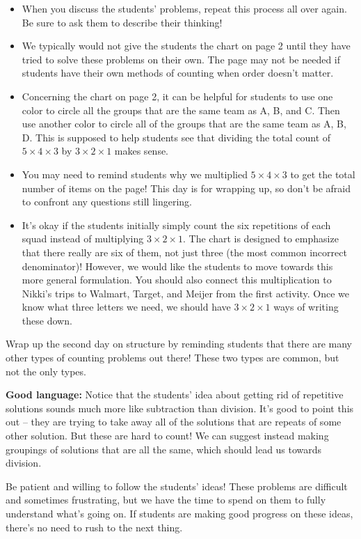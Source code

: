 \documentclass[nooutcomes, noauthor]{ximera}
\begin{document}
\begin{instructorNotes}
\begin{itemize}
	\item When you discuss the students' problems, repeat this process all over again. Be sure to ask them to describe their thinking!
	\item We typically would not give the students the chart on page 2 until they have tried to solve these problems on their own. The page may not be needed if students have their own methods of counting when order doesn't matter.
	\item Concerning the chart on page 2, it can be helpful for students to use one color to circle all the groups that are the same team as A, B, and C.  Then use another color to circle all of the groups that are the same team as A, B, D.  This is supposed to help students see that dividing the total count of $5 \times 4 \times 3$ by $3 \times 2 \times 1$ makes sense.
	\item You may need to remind students why we multiplied $5 \times 4 \times 3$ to get the total number of items on the page! This day is for wrapping up, so don't be afraid to confront any questions still lingering.
	\item It's okay if the students initially simply count the six repetitions of each squad instead of multiplying $3 \times 2 \times 1$. The chart is designed to emphasize that there really are six of them, not just three (the most common incorrect denominator)! However, we would like the students to move towards this more general formulation. You should also connect this multiplication to Nikki's trips to Walmart, Target, and Meijer from the first activity. Once we know what three letters we need, we should have $3 \times 2 \times 1$ ways of writing these down.
\end{itemize}

Wrap up the second day on structure by reminding students that there are many other types of counting problems out there! These two types are common, but not the only types.


{\bf Good language:} Notice that the students' idea about getting rid of repetitive solutions sounds much more like subtraction than division. It's good to point this out -- they are trying to take away all of the solutions that are repeats of some other solution. But these are hard to count! We can suggest instead making groupings of solutions that are all the same, which should lead us towards division.

Be patient and willing to follow the students' ideas! These problems are difficult and sometimes frustrating, but we have the time to spend on them to fully understand what's going on. If students are making good progress on these ideas, there's no need to rush to the next thing.



\end{instructorNotes}
\end{document}
